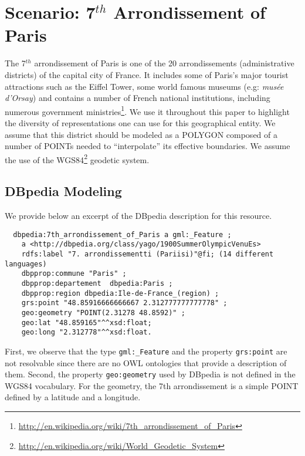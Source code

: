 \section{Scenario: 7$^{th}$ Arrondissement of Paris}                      \label{sec:scenario}

The 7$^{th}$ arrondissement of Paris is one of the 20 arrondissements (administrative districts) of the capital city of France. It includes some of Paris's major tourist attractions such as the Eiffel Tower, some world famous museums (e.g: \textit{mus\'{e}e d'Orsay}) and contains a number of French national institutions, including numerous government ministries\footnote{\url{http://en.wikipedia.org/wiki/7th_arrondissement_of_Paris}}. We use it throughout this paper to highlight the diversity of representations one can use for this geographical entity. We assume that this district should be modeled as a POLYGON composed of a number of POINTs needed to ``interpolate'' its effective boundaries. We assume the use of the WGS84\footnote{\url{http://en.wikipedia.org/wiki/World_Geodetic_System}} geodetic system.

\subsection{DBpedia Modeling}
We provide below an excerpt of the DBpedia description for this resource.
{\scriptsize
\begin{verbatim}
  dbpedia:7th_arrondissement_of_Paris a gml:_Feature ;
    a <http://dbpedia.org/class/yago/1900SummerOlympicVenuEs>
    rdfs:label "7. arrondissementti (Pariisi)"@fi; (14 different languages)
    dbpprop:commune "Paris" ;
    dbpprop:departement  dbpedia:Paris ;
    dbpprop:region dbpedia:Ile-de-France_(region) ;
    grs:point "48.85916666666667 2.312777777777778" ;
    geo:geometry "POINT(2.31278 48.8592)" ;
    geo:lat "48.859165"^^xsd:float;
    geo:long "2.312778"^^xsd:float.
\end{verbatim}
}
First, we observe that the type \texttt{gml:\_Feature} and the property \texttt{grs:point} are not resolvable since there are no OWL ontologies that provide a description of them. Second, the property \texttt{geo:geometry} used by DBpedia is not defined in the WGS84 vocabulary. For the geometry, the 7th arrondissement is a simple POINT defined by a latitude and a longitude.

